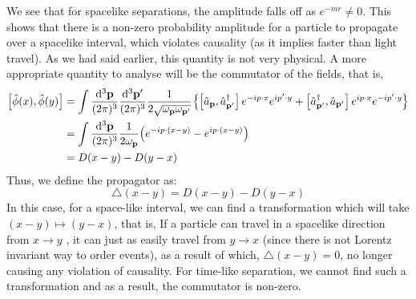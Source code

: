 We see that for spacelike separations, the amplitude falls off as $e^{-mr}\neq 0$. This shows that there is a non-zero probability amplitude for a particle to propagate over a spacelike interval, which violates causality (as it implies faster than light travel). As we had said earlier, this quantity is not very physical. A more appropriate quantity to analyse will be the commutator of the fields, that is,
\begin{align*}
    \left[ \hat{\phi}(x), \hat{\phi}(y) \right] &= \int \frac{\dd^3\vb{{\vb{p}}}}{(2\pi)^3}\frac{\dd^3\vb{{\vb{p}'}}}{(2\pi)^3} \frac{1}{2\sqrt{\omega_{\vb{{p}}}\omega_{\vb{{p}}'}}} \qty{\left[ \hat{a}_{\vb{p}},  \hat{a}_{\vb{p}'}^\dagger\right] e^{-i p\cdot x}e^{i p'\cdot y} + \left[ \hat{a}_{\vb{p}'}^\dagger,  \hat{a}_{\vb{p}'}\right]e^{ip\cdot x}e^{-ip'\cdot y}}\\
    &=\int\frac{\dd^3\vb{{\vb{p}}}}{(2\pi)^3}\frac{1}{2\omega_{\vb{{p}}}} \qty(e^{-i p \cdot (x-y)} - e^{ip\cdot (x-y)})\\
    &=D(x-y) - D(y-x)
\end{align*} 
Thus, we define the propagator as: 
$$\triangle(x-y) = D(x-y) - D(y-x)$$
In this case, for a space-like interval, we can find a transformation which will take $(x-y) \mapsto (y-x)$, that is, If a particle can travel in a spacelike
direction from $x\rightarrow y$ , it can just as easily travel from $y\rightarrow x$ (since there is not Lorentz invariant way to order events), as a result of which, $\triangle(x-y) = 0$, no longer causing any violation of causality. For time-like separation, we cannot find such a transformation and as a result, the commutator is non-zero. 
